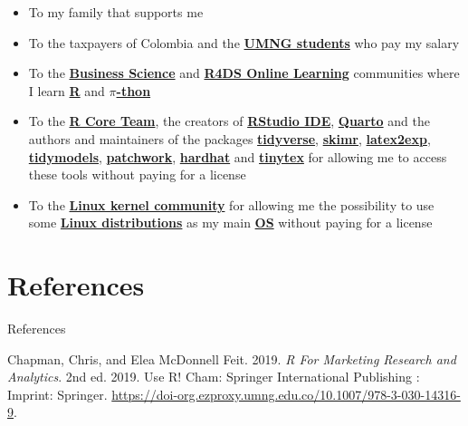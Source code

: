 \documentclass[
  ignorenonframetext,
]{beamer}
\newlength{\cslhangindent}
\newenvironment{CSLReferences}[2] %
 {\begin{list}{}{%
  \setlength{\itemindent}{0pt}
  \setlength{\leftmargin}{0pt}
  \setlength{\parsep}{0pt}
  \ifodd #1
   \setlength{\leftmargin}{\cslhangindent}
   \setlength{\itemindent}{-1\cslhangindent}
  \fi
  \setlength{\itemsep}{#2\baselineskip}}}
 {\end{list}}
\begin{document}
\begin{frame}{}
\label{section-40}
\begin{itemize}
\item
  To my family that supports me
\item
  To the taxpayers of Colombia and the
  \href{https://www.umng.edu.co/estudiante}{\textbf{UMNG students}} who
  pay my salary
\item
  To the \href{https://www.business-science.io/}{\textbf{Business
  Science}} and \href{https://www.rfordatasci.com/}{\textbf{R4DS Online
  Learning}} communities where I learn
  \href{https://www.r-project.org/about.html}{\textbf{R}} and
  \href{https://www.python.org/about/}{\textbf{\(\pi\)-thon}}
\item
  To the \href{https://www.r-project.org/contributors.html}{\textbf{R
  Core Team}}, the creators of
  \href{https://posit.co/products/open-source/rstudio/}{\textbf{RStudio
  IDE}}, \href{https://quarto.org/}{\textbf{Quarto}} and the authors and
  maintainers of the packages
  \href{https://CRAN.R-project.org/package=tidyverse}{\textbf{tidyverse}},
  \href{https://CRAN.R-project.org/package=skimr}{\textbf{skimr}},
  \href{https://CRAN.R-project.org/package=latex2exp}{\textbf{latex2exp}},
  \href{https://CRAN.R-project.org/package=tidymodels}{\textbf{tidymodels}},
  \href{https://CRAN.R-project.org/package=patchwork}{\textbf{patchwork}},
  \href{https://CRAN.R-project.org/package=hardhat}{\textbf{hardhat}}
  and
  \href{https://CRAN.R-project.org/package=tinytex}{\textbf{tinytex}}
  for allowing me to access these tools without paying for a license
\item
  To the \href{https://www.kernel.org/category/about.html}{\textbf{Linux
  kernel community}} for allowing me the possibility to use some
  \href{https://static.lwn.net/Distributions/}{\textbf{Linux
  distributions}} as my main
  \href{https://en.wikipedia.org/wiki/Operating_system}{\textbf{OS}}
  without paying for a license
\end{itemize}
\end{frame}

\section*{References}\label{references}

\begin{frame}[allowframebreaks]{References}
\label{refs}
\begin{CSLReferences}{1}{0}
Chapman, Chris, and Elea McDonnell Feit. 2019. \emph{R {For} {Marketing}
{Research} and {Analytics}}. 2nd ed. 2019. Use {R}! Cham: Springer
International Publishing : Imprint: Springer.
\url{https://doi-org.ezproxy.umng.edu.co/10.1007/978-3-030-14316-9}.

\end{CSLReferences}
\end{frame}
\end{document}
